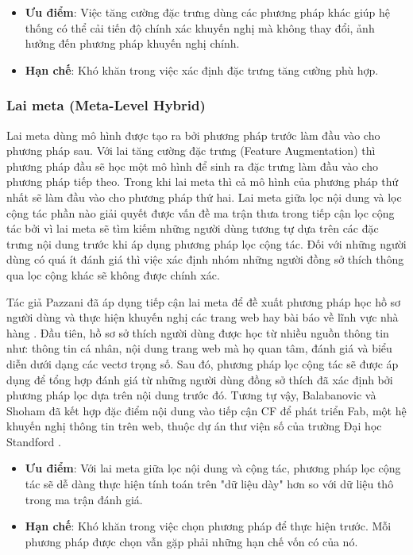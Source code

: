 \begin{itemize}
	\item \textbf{Ưu điểm}: Việc tăng cường đặc trưng dùng các phương pháp khác giúp hệ thống có thể cải tiến độ chính xác khuyến nghị mà không thay đổi, ảnh hưởng đến phương pháp khuyến nghị chính.
\end{itemize}
\begin{itemize}
	\item \textbf{Hạn chế}: Khó khăn trong việc xác định đặc trưng tăng cường phù hợp. 
\end{itemize}

\subsubsection{Lai meta (Meta-Level Hybrid)}
Lai meta dùng mô hình được tạo ra bởi phương pháp trước làm đầu vào cho phương pháp sau. Với lai tăng cường đặc trưng (Feature Augmentation) thì phương pháp đầu sẽ học một mô hình để sinh ra đặc trưng làm đầu vào cho phương pháp tiếp theo. Trong khi lai meta thì cả mô hình của phương pháp thứ nhất sẽ làm đầu vào cho phương pháp thứ hai. Lai meta giữa lọc nội dung và lọc cộng tác phần nào giải quyết được vấn đề ma trận thưa trong tiếp cận lọc cộng tác bởi vì lai meta sẽ tìm kiếm những người dùng tương tự dựa trên các đặc trưng nội dung trước khi áp dụng phương pháp lọc cộng tác. Đối với những người dùng có quá ít đánh giá thì việc xác định nhóm những người đồng sở thích thông qua lọc cộng khác sẽ không được chính xác. 

Tác giả Pazzani đã áp dụng tiếp cận lai meta để đề xuất phương pháp học hồ sơ người dùng và thực hiện khuyến nghị các trang web hay bài báo về lĩnh vực nhà hàng \cite{Pazzani:1999:FCC}. Đầu tiên, hồ sơ sở thích người dùng được học từ nhiều nguồn thông tin như: thông tin cá nhân, nội dung trang web mà họ quan tâm, đánh giá và biểu diễn dưới dạng các vectơ trọng số. Sau đó, phương pháp lọc cộng tác sẽ được áp dụng để tổng hợp đánh giá từ những người dùng đồng sở thích đã xác định bởi phương pháp lọc dựa trên nội dung trước đó. Tương tự vậy, Balabanovic và Shoham đã kết hợp đặc điểm nội dung vào tiếp cận CF để phát triển Fab, một hệ khuyến nghị thông tin trên web, thuộc dự án thư viện số của trường Đại học Standford \cite{Balabanovic:1997:FCC}. 

\begin{itemize}
	\item \textbf{Ưu điểm}: Với lai meta giữa lọc nội dung và cộng tác, phương pháp lọc cộng tác sẽ dễ dàng thực hiện tính toán trên "dữ liệu dày" hơn so với dữ liệu thô trong ma trận đánh giá. 
\end{itemize}
\begin{itemize}
	\item \textbf{Hạn chế}: Khó khăn trong việc chọn phương pháp để thực hiện trước. Mỗi phương pháp được chọn vẫn gặp phải những hạn chế vốn có của nó.
\end{itemize}

